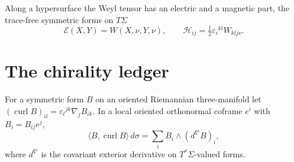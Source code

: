 \documentclass[11pt,letterpaper]{article}
\numberwithin{equation}{section}
\theoremstyle{definition}
\DeclareMathOperator{\curl}{curl}
\begin{document}
Along a hypersurface the Weyl tensor has an electric and a magnetic part,
the trace-free symmetric forms on \(T\Sigma\)
\[
 \mathcal E(X,Y)=W(X,\nu,Y,\nu),\qquad
 \mathcal H_{ij}=\tfrac12\varepsilon_i{}^{kl}W_{klj\nu} .
\]

\section{The chirality ledger}\label{sec:ledger}

For a symmetric form \(B\) on an oriented Riemannian three-manifold let
\((\curl B)_{il}=\varepsilon_l{}^{jk}\nabla_jB_{ik}\). In a local oriented
orthonormal coframe \(e^i\) with \(B_i=B_{ij}e^j\),
\begin{equation}\label{eq:curl-form}
 \langle B,\curl B\rangle\,d\sigma=\sum_iB_i\wedge(d^\nabla B)_i ,
\end{equation}
where \(d^\nabla\) is the covariant exterior derivative on
\(T^*\Sigma\)-valued forms.
\end{document}

